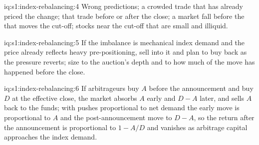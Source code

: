 \begin{solution}{iq:s1:index-rebalancing:4}
Wrong predictions; a crowded trade that has already priced the change;  that trade before or after the close; a market fall before the 
that moves the cut-off; stocks near the cut-off that are small and illiquid.
\end{solution}

\begin{solution}{iq:s1:index-rebalancing:5}
If the imbalance is mechanical index demand and the price already reflects heavy pre-positioning, sell into it and plan to buy back as the pressure reverts;
size to the auction's depth and to how much of the move has happened before the close.
\end{solution}

\begin{solution}{iq:s1:index-rebalancing:6}
If arbitrageurs buy $A$ before the announcement and  buy $D$ at the effective close, the market absorbs $A$ early and $D - A$ later, and sells $A$
back to the funds; with pushes proportional to net demand the early move is proportional to $A$ and the post-announcement move to $D - A$, so the return
after the announcement is proportional to $1 - A/D$ and vanishes as arbitrage capital approaches the index demand.
\end{solution}
